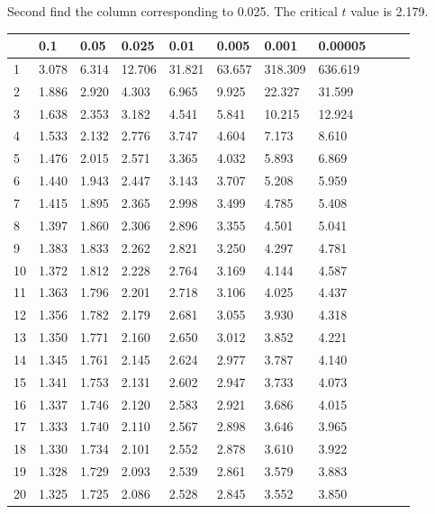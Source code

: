 \begin{frame}
{\small Second find the column corresponding to 0.025. The critical $t$ value is 2.179.}

  {
\fontsize{5pt}{5pt}
\selectfont

\begin{tabular}{l|ll>{\columncolor{blue}}llllllll}
 & 0.1&0.05&0.025&0.01&0.005&0.001&0.00005\\ \hline
 1 & 3.078 & 6.314 & 12.706 & 31.821 & 63.657 & 318.309 & 636.619 \\ 
 2 & 1.886 & 2.920 & 4.303 & 6.965 & 9.925 & 22.327 & 31.599 \\ 
 3 & 1.638 & 2.353 & 3.182 & 4.541 & 5.841 & 10.215 & 12.924 \\ 
 4 & 1.533 & 2.132 & 2.776 & 3.747 & 4.604 & 7.173 & 8.610 \\ 
 5 & 1.476 & 2.015 & 2.571 & 3.365 & 4.032 & 5.893 & 6.869 \\ 
[5pt]
 6 & 1.440 & 1.943 & 2.447 & 3.143 & 3.707 & 5.208 & 5.959 \\ 
 7 & 1.415 & 1.895 & 2.365 & 2.998 & 3.499 & 4.785 & 5.408 \\ 
 8 & 1.397 & 1.860 & 2.306 & 2.896 & 3.355 & 4.501 & 5.041 \\ 
 9 & 1.383 & 1.833 & 2.262 & 2.821 & 3.250 & 4.297 & 4.781 \\ 
10 & 1.372 & 1.812 & 2.228 & 2.764 & 3.169 & 4.144 & 4.587 \\ 
[5pt]
11 & 1.363 & 1.796 & 2.201 & 2.718 & 3.106 & 4.025 & 4.437 \\ 
12 & 1.356 & 1.782 & 2.179 & 2.681 & 3.055 & 3.930 & 4.318 \\ 
13 & 1.350 & 1.771 & 2.160 & 2.650 & 3.012 & 3.852 & 4.221 \\ 
14 & 1.345 & 1.761 & 2.145 & 2.624 & 2.977 & 3.787 & 4.140 \\ 
15 & 1.341 & 1.753 & 2.131 & 2.602 & 2.947 & 3.733 & 4.073 \\ 
[5pt]
16 & 1.337 & 1.746 & 2.120 & 2.583 & 2.921 & 3.686 & 4.015 \\ 
17 & 1.333 & 1.740 & 2.110 & 2.567 & 2.898 & 3.646 & 3.965 \\ 
18 & 1.330 & 1.734 & 2.101 & 2.552 & 2.878 & 3.610 & 3.922 \\ 
\rowcolor{red}19 & 1.328 & 1.729 & 2.093 & 2.539 & 2.861 & 3.579 & 3.883 \\ 
20 & 1.325 & 1.725 & 2.086 & 2.528 & 2.845 & 3.552 & 3.850 \\ 

\end{tabular}}
\end{frame}
